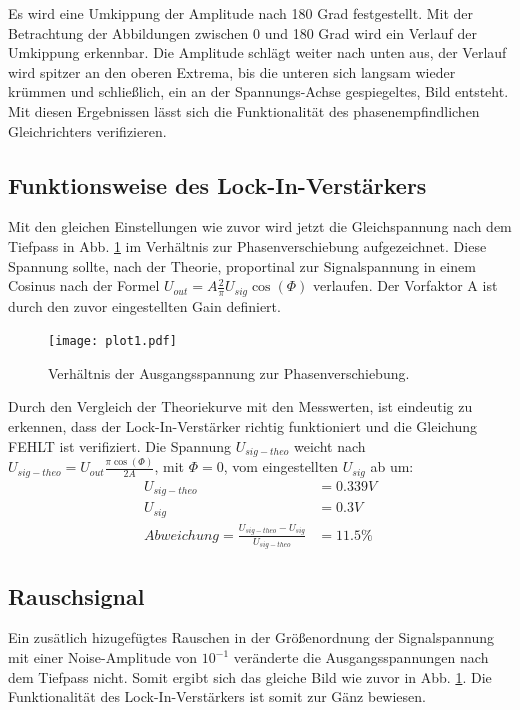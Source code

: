 Es wird eine Umkippung der Amplitude nach 180 Grad festgestellt. 
Mit der Betrachtung der Abbildungen zwischen 0 und 180 Grad wird ein Verlauf der Umkippung erkennbar.
Die Amplitude schlägt weiter nach unten aus, der Verlauf wird spitzer an den oberen Extrema, bis die unteren sich langsam wieder krümmen und schließlich, ein an der Spannungs-Achse gespiegeltes, Bild entsteht.
Mit diesen Ergebnissen lässt sich die Funktionalität des phasenempfindlichen Gleichrichters verifizieren.

\subsection{Funktionsweise des Lock-In-Verstärkers}
\label{Funktionsweise}

Mit den gleichen Einstellungen wie zuvor wird jetzt die Gleichspannung nach dem Tiefpass in Abb. \ref{fig:plot1} im Verhältnis zur Phasenverschiebung aufgezeichnet.
Diese Spannung sollte, nach der Theorie, proportinal zur Signalspannung in einem Cosinus nach der Formel $U_{out} = A \frac{2}{\pi}U_{sig}\cos(\Phi)$ verlaufen.
Der Vorfaktor A ist durch den zuvor eingestellten Gain definiert.

\begin{figure}
  \centering
  \texttt{[image: plot1.pdf]}
  \caption{Verhältnis der Ausgangsspannung zur Phasenverschiebung.}
  \label{fig:plot1}
\end{figure}

Durch den Vergleich der Theoriekurve mit den Messwerten, ist eindeutig zu erkennen, dass der Lock-In-Verstärker richtig funktioniert und die Gleichung FEHLT ist verifiziert.
Die Spannung $U_{sig-theo}$ weicht nach $U_{sig-theo} = U_{out} \frac{\pi \cos(\Phi)}{2A}$, mit $\Phi = 0$, vom eingestellten $U_{sig}$ ab um:
\begin{align*}
  U_{sig-theo} &= 0.339 V \\
  U_{sig} &= 0.3 V \\
  Abweichung = \frac{U_{sig-theo} - U_{sig}}{U_{sig-theo}} &= 11.5 \%
\end{align*}


\subsection{Rauschsignal}
\label{sec:Rausch}

Ein zusätlich hizugefügtes Rauschen in der Größenordnung der Signalspannung mit einer Noise-Amplitude von $10^{-1}$ veränderte die Ausgangsspannungen nach dem Tiefpass nicht.
Somit ergibt sich das gleiche Bild wie zuvor in Abb. \ref{fig:plot1}.
Die Funktionalität des Lock-In-Verstärkers ist somit zur Gänz bewiesen.

